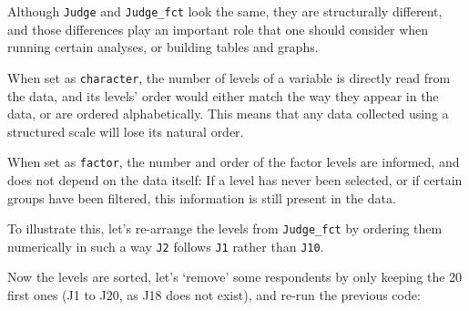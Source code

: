 \documentclass[
]{book}
\newenvironment{Shaded}{\begin{snugshade}}{\end{snugshade}}
\newcommand{\AttributeTok}[1]{\textcolor[rgb]{0.77,0.63,0.00}{#1}}
\newcommand{\ConstantTok}[1]{\textcolor[rgb]{0.00,0.00,0.00}{#1}}
\newcommand{\DecValTok}[1]{\textcolor[rgb]{0.00,0.00,0.81}{#1}}
\newcommand{\FunctionTok}[1]{\textcolor[rgb]{0.00,0.00,0.00}{#1}}
\newcommand{\NormalTok}[1]{#1}
\newcommand{\OtherTok}[1]{\textcolor[rgb]{0.56,0.35,0.01}{#1}}
\newcommand{\SpecialCharTok}[1]{\textcolor[rgb]{0.00,0.00,0.00}{#1}}
\newcommand{\StringTok}[1]{\textcolor[rgb]{0.31,0.60,0.02}{#1}}
\begin{document}
Although \texttt{Judge} and \texttt{Judge\_fct} look the same, they are structurally different, and those differences play an important role that one should consider when running certain analyses, or building tables and graphs.

When set as \texttt{character}, the number of levels of a variable is directly read from the data, and its levels' order would either match the way they appear in the data, or are ordered alphabetically. This means that any data collected using a structured scale will lose its natural order.

When set as \texttt{factor}, the number and order of the factor levels are informed, and does not depend on the data itself: If a level has never been selected, or if certain groups have been filtered, this information is still present in the data.

To illustrate this, let's re-arrange the levels from \texttt{Judge\_fct} by ordering them numerically in such a way \texttt{J2} follows \texttt{J1} rather than \texttt{J10}.

\begin{Shaded}
\end{Shaded}

Now the levels are sorted, let's `remove' some respondents by only keeping the 20 first ones (J1 to J20, as J18 does not exist), and re-run the previous code:

\begin{Shaded}
\end{Shaded}
\end{document}
